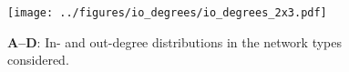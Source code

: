 

\begin{figure}[h]
  \texttt{[image: ../figures/io\_degrees/io\_degrees\_2x3.pdf]} %
\caption{\textbf{A--D}: In- and out-degree distributions in the network types considered. }
\label{fig:io_deg}
\end{figure}


